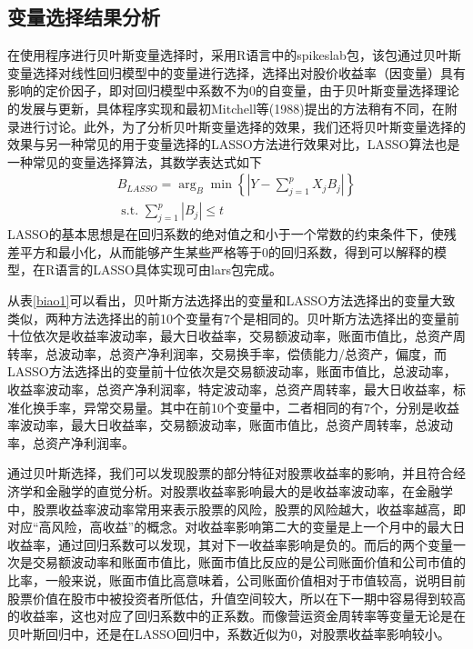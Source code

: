 \documentclass[12pt]{article} %
\begin{document}
	
	
	\subsection{变量选择结果分析 \label{S3.2}}
	
	在使用程序进行贝叶斯变量选择时，采用R语言中的spikeslab包\cite{ishwaran2010spikeslab}，该包通过贝叶斯变量选择对线性回归模型中的变量进行选择，选择出对股价收益率（因变量）具有影响的定价因子，即对回归模型中系数不为0的自变量，由于贝叶斯变量选择理论的发展与更新，具体程序实现和最初Mitchell等(1988)提出的方法稍有不同，在附录进行讨论。此外，为了分析贝叶斯变量选择的效果，我们还将贝叶斯变量选择的效果与另一种常见的用于变量选择的LASSO方法进行效果对比，LASSO算法也是一种常见的变量选择算法，其数学表达式如下
	\begin{equation*}
		\begin{gathered}
			B_{L A S S O}=\arg _{B} \min \left\{\left|Y-\sum_{j=1}^{p} X_{j} B_{j}\right|\right\} \\
			\text { s.t. } \sum_{j=1}^{p}\left|B_{j}\right| \leq t
		\end{gathered}
	\end{equation*}
	LASSO的基本思想是在回归系数的绝对值之和小于一个常数的约束条件下，使残差平方和最小化，从而能够产生某些严格等于0的回归系数，得到可以解释的模型，在R语言的LASSO具体实现可由lars包完成。
	
	从表\ref{biao1}可以看出，贝叶斯方法选择出的变量和LASSO方法选择出的变量大致类似，两种方法选择出的前10个变量有7个是相同的。贝叶斯方法选择出的变量前十位依次是收益率波动率，最大日收益率，交易额波动率，账面市值比，总资产周转率，总波动率，总资产净利润率，交易换手率，偿债能力/总资产，偏度，而LASSO方法选择出的变量前十位依次是交易额波动率，账面市值比，总波动率，收益率波动率，总资产净利润率，特定波动率，总资产周转率，最大日收益率，标准化换手率，异常交易量。其中在前10个变量中，二者相同的有7个，分别是收益率波动率，最大日收益率，交易额波动率，账面市值比，总资产周转率，总波动率，总资产净利润率。
	
	通过贝叶斯选择，我们可以发现股票的部分特征对股票收益率的影响，并且符合经济学和金融学的直觉分析。对股票收益率影响最大的是收益率波动率，在金融学中，股票收益率波动率常用来表示股票的风险，股票的风险越大，收益率越高，即对应“高风险，高收益”的概念。对收益率影响第二大的变量是上一个月中的最大日收益率，通过回归系数可以发现，其对下一收益率影响是负的。而后的两个变量一次是交易额波动率和账面市值比，账面市值比反应的是公司账面价值和公司市值的比率，一般来说，账面市值比高意味着，公司账面价值相对于市值较高，说明目前股票价值在股市中被投资者所低估，升值空间较大，所以在下一期中容易得到较高的收益率，这也对应了回归系数中的正系数。而像营运资金周转率等变量无论是在贝叶斯回归中，还是在LASSO回归中，系数近似为0，对股票收益率影响较小。
	
\end{document}
